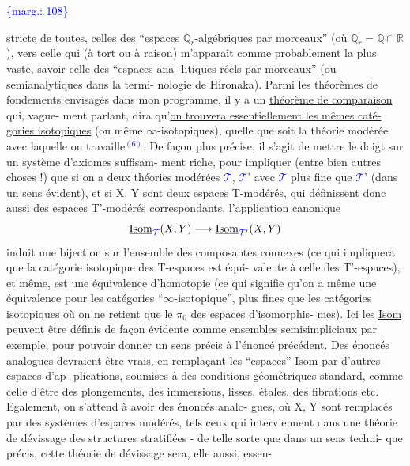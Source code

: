 \documentclass[11pt]{article}
\newcommand{\scanpage}[1]{\par\bigskip\noindent{\small\sffamily[scan #1]}\par}
\newcommand{\mspage}[1]{{\small\sffamily[p.\,#1]}}
\newcommand{\hand}[1]{\textcolor{blue}{#1}}
\newcommand{\margin}[1]{\textcolor{blue}{\{\textsf{marg.:} #1\}}}
\newcommand{\uline}[1]{\underline{#1}}
\begin{document}
\margin{108}

\clearpage
\scanpage{119/109}
\mspage{31}

stricte de toutes, celles des ``espaces $\bar{\mathbb{Q}}_r$-algébriques par morceaux''
(où $\bar{\mathbb{Q}}_r = \bar{\mathbb{Q}} \cap \mathbb{R}$), vers celle qui (à tort ou à raison) m'apparaît
comme probablement la plus vaste, savoir celle des ``espaces ana-%
litiques réels par morceaux'' (ou semianalytiques dans la termi-%
nologie de Hironaka). Parmi les théorèmes de fondements envisagés
dans mon programme, il y a un \uline{théorème de comparaison} qui, vague-%
ment parlant, dira qu'\uline{on trouvera essentiellement les mêmes caté-%
gories isotopiques} (ou même $\infty$-isotopiques), quelle que soit la
théorie modérée avec laquelle on travaille\hand{$^{(6)}$}. De façon plus précise,
il s'agit de mettre le doigt sur un système d'axiomes suffisam-%
ment riche, pour impliquer (entre bien autres choses !) que si on
a deux théories modérées \hand{$\mathcal{T}$}, \hand{$\mathcal{T}$}' avec \hand{$\mathcal{T}$} plus fine que \hand{$\mathcal{T}$}' (dans
un sens évident), et si X, Y sont deux espaces T-modérés, qui
définissent donc aussi des espaces T'-modérés correspondants,
l'application canonique
\[ \underline{\mathrm{Isom}}_{\hand{\mathcal{T}}}(X,Y) \longrightarrow \underline{\mathrm{Isom}}_{\hand{\mathcal{T}}'}(X,Y) \]
induit une bijection sur l'ensemble des composantes connexes (ce
qui impliquera que la catégorie isotopique des T-espaces est équi-%
valente à celle des T'-espaces), et même, est une équivalence
d'homotopie (ce qui signifie qu'on a même une équivalence pour
les catégories ``$\infty$-isotopique'', plus fines que les catégories
isotopiques où on ne retient que le $\pi_0$ des espaces d'isomorphis-%
mes). Ici les \uline{Isom} peuvent être définis de façon évidente comme
ensembles semisimpliciaux par exemple, pour pouvoir donner un sens
précis à l'énoncé précédent. Des énoncés analogues devraient être
vrais, en remplaçant les ``espaces'' \uline{Isom} par d'autres espaces d'ap-%
plications, soumises à des conditions géométriques standard, comme
celle d'être des plongements, des immersions, lisses, étales, des
fibrations etc. Egalement, on s'attend à avoir des énoncés analo-%
gues, où X, Y sont remplacés par des systèmes d'espaces modérés,
tels ceux qui interviennent dans une théorie de dévissage des
structures stratifiées - de telle sorte que dans un sens techni-%
que précis, cette théorie de dévissage sera, elle aussi, essen-%
\end{document}
